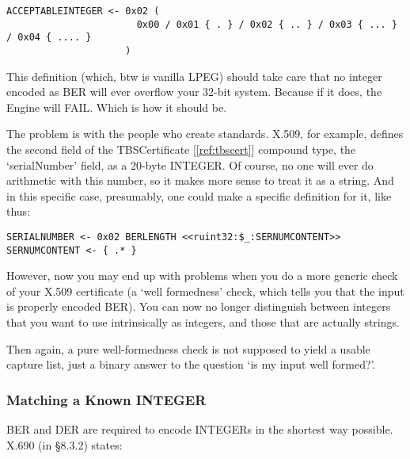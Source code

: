 \begin{changemargin}{-60mm}{0mm}
\begin{myquote}
\begin{verbatim}
ACCEPTABLEINTEGER <- 0x02 (
                       0x00 / 0x01 { . } / 0x02 { .. } / 0x03 { ... } / 0x04 { .... }
                     )
\end{verbatim}
\end{myquote}
\end{changemargin}

This definition (which, btw is vanilla LPEG)
should take care that no integer encoded as BER will ever 
overflow your 32-bit system.
Because if it does, the Engine will FAIL.
Which is how it should be.

The problem is with the people who create standards.
X.509, for example, defines the second field 
of the TBSCertificate [\ref{ref:tbscert}]
compound type, the ‘serialNumber’ field, as a 
20-byte INTEGER. Of course, no one will ever do arithmetic with this 
number, so it makes more sense to treat it as a string. And in this specific 
case, presumably, one could make a specific definition for it, like thus:

\begin{changemargin}{-60mm}{0mm}
\begin{myquote}
\begin{verbatim}
SERIALNUMBER <- 0x02 BERLENGTH <<ruint32:$_:SERNUMCONTENT>>
SERNUMCONTENT <- { .* }
\end{verbatim}
\end{myquote}
\end{changemargin}

However, now you may end up with problems when you do a more generic check 
of your X.509 certificate (a ‘well formedness’ check, which tells you 
that the input is properly encoded BER). You can now no longer distinguish 
between integers that you want to use intrinsically as integers, and those 
that are actually strings.

Then again, a pure well-formedness check is not supposed to yield a usable 
capture list, just a binary answer to the question ‘is my input well 
formed?’.

\subsubsection{Matching a Known INTEGER}
\label{sec:work:ints:known}

BER and DER are required to encode INTEGERs in the shortest way possible. 
X.690 \cite{bib:x690} (in §8.3.2) states:

